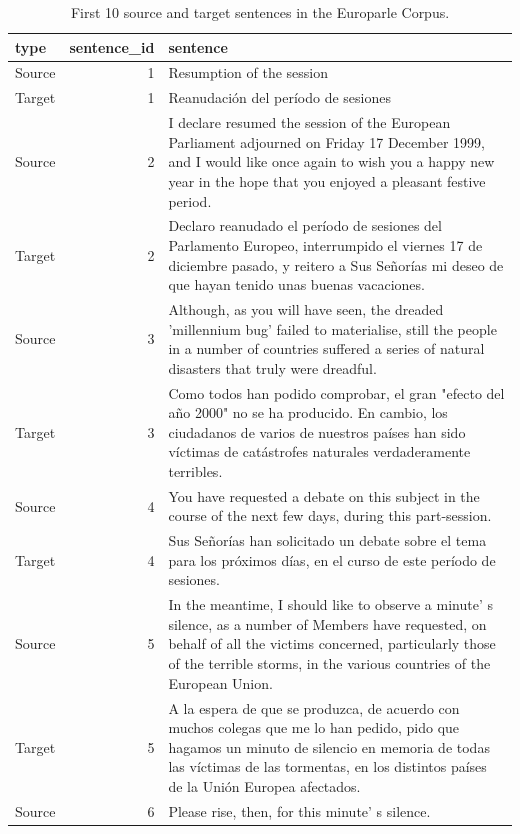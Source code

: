 \documentclass[
  letterpaper,
]{latex/krantz}
\begin{document}
\hypertarget{tbl-structure-europarle}{}
\begin{table}
\caption{\label{tbl-structure-europarle}First 10 source and target sentences in the Europarle Corpus. }\tabularnewline

\centering
\begin{tabular}{lrl}
\toprule
type & sentence\_id & sentence\\
\midrule
Source & 1 & Resumption of the session\\
Target & 1 & Reanudación del período de sesiones\\
Source & 2 & I declare resumed the session of the European Parliament adjourned on Friday 17 December 1999, and I would like once again to wish you a happy new year in the hope that you enjoyed a pleasant festive period.\\
Target & 2 & Declaro reanudado el período de sesiones del Parlamento Europeo, interrumpido el viernes 17 de diciembre pasado, y reitero a Sus Señorías mi deseo de que hayan tenido unas buenas vacaciones.\\
Source & 3 & Although, as you will have seen, the dreaded 'millennium bug' failed to materialise, still the people in a number of countries suffered a series of natural disasters that truly were dreadful.\\
\addlinespace
Target & 3 & Como todos han podido comprobar, el gran "efecto del año 2000" no se ha producido. En cambio, los ciudadanos de varios de nuestros países han sido víctimas de catástrofes naturales verdaderamente terribles.\\
Source & 4 & You have requested a debate on this subject in the course of the next few days, during this part-session.\\
Target & 4 & Sus Señorías han solicitado un debate sobre el tema para los próximos días, en el curso de este período de sesiones.\\
Source & 5 & In the meantime, I should like to observe a minute' s silence, as a number of Members have requested, on behalf of all the victims concerned, particularly those of the terrible storms, in the various countries of the European Union.\\
Target & 5 & A la espera de que se produzca, de acuerdo con muchos colegas que me lo han pedido, pido que hagamos un minuto de silencio en memoria de todas las víctimas de las tormentas, en los distintos países de la Unión Europea afectados.\\
\addlinespace
Source & 6 & Please rise, then, for this minute' s silence.\\

\end{tabular}
\end{table}
\end{document}
